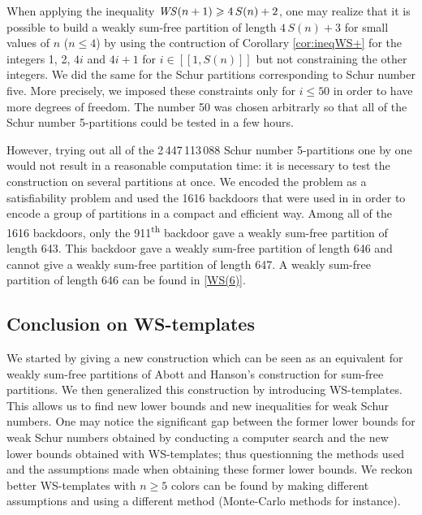 When applying the inequality \(\mathit{WS}(n+1) \geqslant 4 \, S(n) + 2\), one may realize that it is possible to build a weakly 
sum-free partition of length \(4 \, S(n) + 3\) for small values of \(n\) (\(n \leqslant 4\)) by using the contruction of 
Corollary \ref{cor:ineqWS+} for the integers 1, 2, \(4i\) and \(4i+1\) for \(i \in [\![1, S(n)]\!]\) but not 
constraining the other integers. We did the same for the Schur partitions corresponding to Schur number five. More precisely, 
we imposed these constraints only for \(i \leqslant 50\) in order to have more degrees of freedom. The number 50 was chosen 
arbitrarly so that all of the Schur number 5-partitions could be tested in a few hours.

However, trying out all of the 2\,447\,113\,088 Schur number 5-partitions \cite{Heule2017} one by one would not result in a 
reasonable computation time: it is necessary to test the construction on several partitions at once. We encoded the problem as a 
satisfiability problem and used the 1616 backdoors that were used in \cite{Heule2017} in order to encode a group of partitions in 
a compact and efficient way. Among all of the 1616 backdoors, only the 911\textsuperscript{th} backdoor gave a weakly sum-free 
partition of length 643. This backdoor gave a weakly sum-free partition of length 646 and cannot give a weakly sum-free 
partition of length 647. A weakly sum-free partition of length 646 can be found in \ref{WS(6)}.


\subsection{Conclusion on WS-templates}

We started by giving a new construction which can be seen as an equivalent for weakly sum-free partitions of Abott
and Hanson's construction for sum-free partitions. We then generalized this construction by introducing WS-templates. This
allows us to find new lower bounds and new inequalities for weak Schur numbers. One may notice the significant gap
between the former lower bounds for weak Schur numbers obtained by conducting a computer search and the new lower bounds
obtained with WS-templates; thus questionning the methods used and the assumptions made when obtaining these former lower 
bounds. We reckon better WS-templates with \(n \geqslant 5\) colors can be found by making different assumptions 
and using a different method (Monte-Carlo methods for instance).
